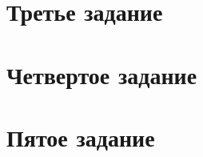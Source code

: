 \documentclass[a4paper,11pt]{article} %
\begin{document}
	\section{Третье задание}
	
	\section{Четвертое задание}
	
	\section{Пятое задание}
	
\end{document}

